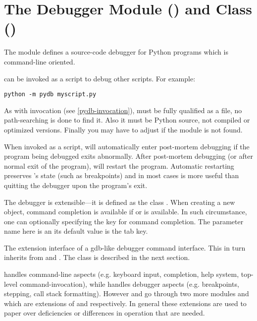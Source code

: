 \section{The Debugger Module () and Class () \label{pydb-module-class}}

The module  defines a source-code
debugger for Python programs which is command-line
oriented. 

 can be invoked as a script to debug other scripts.  For
example:

\begin{verbatim}
python -m pydb myscript.py
\end{verbatim}

As with  invocation (see \ref{pydb-invocation}), 
must be fully qualified as a file, no path-searching is done to find
it. Also it must be Python source, not compiled or optimized
versions. Finally you may have to adjust  if the
module  is not found.

When invoked as a script,  will automatically enter
post-mortem debugging if the program being debugged exits
abnormally. After post-mortem debugging (or after normal exit of the
program),  will restart the program. Automatic restarting
preserves 's state (such as breakpoints) and in most cases
is more useful than quitting the debugger upon the program's exit.

The debugger is extensible---it is defined as the class
.  When
creating a new  object, command completion is available if
or  is available. In such circumstance, one can
optionally specifying the key for command completion. The parameter
name here is  an its default value is the tab key.

The  extension interface of  a gdb-like debugger
command interface. This in turn inherits from  and
. The  class is described in the next section.

 handles command-line aspects (e.g. keyboard input,
completion, help system, top-level command-invocation), while
 handles debugger aspects (e.g. breakpoints, stepping, call
stack formatting). However  and  go through two
more modules  and  which are extensions of
 and
 respectively. In general these extensions are used to
paper over deficiencies or differences in operation that are needed.

